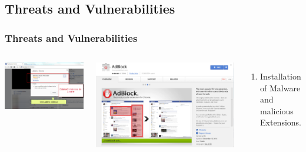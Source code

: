 \documentclass[serif,9pt]{beamer}
\begin{document}
\subsection{Threats and Vulnerabilities}
\begin{frame}
	\frametitle{Threats and Vulnerabilities}
	\begin{columns}
	\begin{minipage}[c][0.4\textheight][c]{\linewidth}
	  \centering
	  \includegraphics[scale=0.3]{figures/fbporn3.png}
	  \label{fig:Malware}
	\end{minipage}
	\begin{minipage}[c][0.4\textheight][c]{\linewidth}
	  \centering
	  \includegraphics[scale=0.10]{figures/Adblock.png}
	  \label{fig:vulnExt}
	\end{minipage}
	\begin{minipage}[c][0.4\textheight][c]{\linewidth}
	  \begin{enumerate}
	  \item Installation of Malware and malicious Extensions.

\end{enumerate}
\end{minipage}
\end{columns}
\end{frame}
\end{document}
